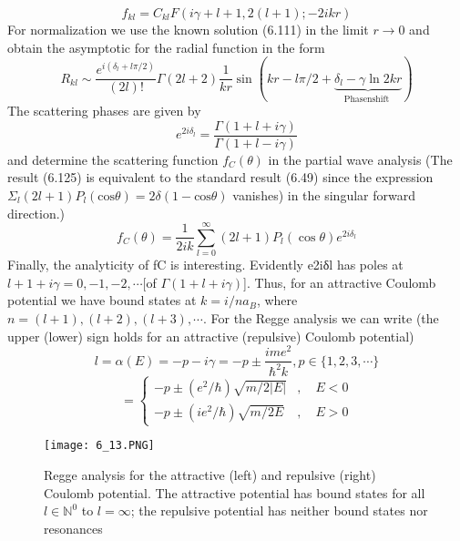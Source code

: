 \begin{equation}
    f_{k l}=C_{k l} F(i \gamma+l+1,2(l+1) ;-2 i k r)
    \end{equation}
For normalization we use the known solution (6.111) in the limit $r \rightarrow 0$ and obtain the asymptotic for the radial function in the form
\begin{equation}
    R_{k l} \sim \frac{e^{i\left(\delta_{l}+l \pi / 2\right)}}{(2 l) !} \Gamma(2 l+2) \frac{1}{k r} \sin (k r-l \pi / 2+\underbrace{\delta_{l}-\gamma \ln 2 k r}_{\text {Phasenshift }})
    \end{equation}
The scattering phases are given by
\begin{equation}
    e^{2 i \delta_{l}}=\frac{\Gamma(1+l+i \gamma)}{\Gamma(1+l-i \gamma)}
    \end{equation}
and determine the scattering function $f_C (\theta)$ in the partial wave analysis (The result (6.125) is equivalent to the standard result (6.49) since the expression $\Sigma_l (2l + 1) P_l (\text{cos}\theta) = 2\delta (1 - \text{cos}\theta)$ vanishes) in the singular forward direction.)
\begin{equation}
    f_{C}(\theta)=\frac{1}{2 i k} \sum_{l=0}^{\infty}(2 l+1) P_{l}(\cos \theta) e^{2 i \delta_{l}}
    \end{equation}
Finally, the analyticity of fC is interesting. Evidently e2iδl has poles at $l + 1 + i\gamma = 0, -1, -2, \cdots $[of $\Gamma (1 + l + i\gamma)$]. Thus, for an attractive Coulomb potential we have bound states at $k = i / na_B$, where $n = (l + 1), (l + 2), (l + 3), \cdots$. For the Regge analysis we can write (the upper (lower) sign holds for an attractive (repulsive) Coulomb potential)
\begin{equation}
    l=\alpha(E)=-p-i \gamma=-p \pm \frac{i m e^{2}}{\hbar^{2} k}, p \in\{1,2,3, \cdots\}
    \end{equation}
\begin{equation}
=\left\{\begin{array}{ll}{-p \pm\left(e^{2} / \hbar\right) \sqrt{m / 2|E|}} & {, \quad E<0} \\ {-p \pm\left(i e^{2} / \hbar\right) \sqrt{m / 2 E}} & {, \quad E>0}\end{array}\right.
\end{equation}
\begin{figure}[ht]
        \centering
        \texttt{[image: 6\_13.PNG]}
        \caption{Regge analysis for the attractive (left) and repulsive (right) Coulomb potential. The attractive potential has bound states for all $l \in \mathbb{N}^0$ to $l = \infty$; the repulsive potential has neither bound states nor resonances}
\end{figure}
